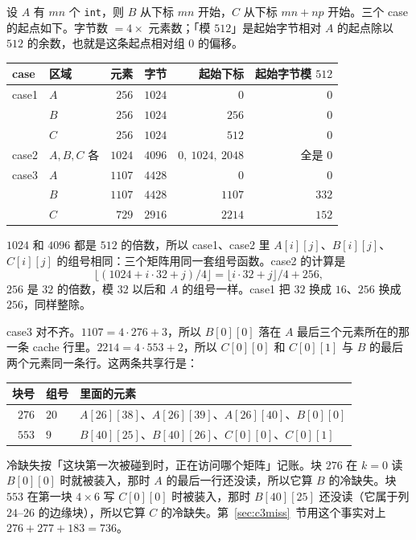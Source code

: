 \documentclass[11pt,a4paper,fontset=fandol]{ctexart}
\newcommand{\code}[1]{\texttt{#1}}
\begin{document}
设 $A$ 有 $mn$ 个 \code{int}，则 $B$ 从下标 $mn$ 开始，$C$ 从下标 $mn+np$ 开始。三个 case 的起点如下。字节数 $=4\times$ 元素数；「模 $512$」是起始字节相对 $A$ 的起点除以 $512$ 的余数，也就是这条起点相对组 $0$ 的偏移。

\begin{center}
\small
\begin{tabular}{@{}llrrrr@{}}
\toprule
case & 区域 & 元素 & 字节 & 起始下标 & 起始字节模 $512$\\
\midrule
case1 & $A$ & $256$ & $1024$ & $0$ & $0$\\
 & $B$ & $256$ & $1024$ & $256$ & $0$\\
 & $C$ & $256$ & $1024$ & $512$ & $0$\\
case2 & $A,B,C$ 各 & $1024$ & $4096$ & $0,\ 1024,\ 2048$ & 全是 $0$\\
case3 & $A$ & $1107$ & $4428$ & $0$ & $0$\\
 & $B$ & $1107$ & $4428$ & $1107$ & $332$\\
 & $C$ & $729$ & $2916$ & $2214$ & $152$\\
\bottomrule
\end{tabular}
\end{center}

$1024$ 和 $4096$ 都是 $512$ 的倍数，所以 case1、case2 里 $A[i][j]$、$B[i][j]$、$C[i][j]$ 的组号相同：三个矩阵用同一套组号函数。case2 的计算是
\[
\lfloor(1024+i\cdot 32+j)/4\rfloor=\lfloor i\cdot 32+j\rfloor/4+256,
\]
$256$ 是 $32$ 的倍数，模 $32$ 以后和 $A$ 的组号一样。case1 把 $32$ 换成 $16$、$256$ 换成 $256$，同样整除。

case3 对不齐。$1107=4\cdot276+3$，所以 $B[0][0]$ 落在 $A$ 最后三个元素所在的那一条 cache 行里。$2214=4\cdot553+2$，所以 $C[0][0]$ 和 $C[0][1]$ 与 $B$ 的最后两个元素同一条行。这两条共享行是：

\begin{center}
\small
\begin{tabular}{@{}rll@{}}
\toprule
块号 & 组号 & 里面的元素\\
\midrule
$276$ & $20$ & $A[26][38]$、$A[26][39]$、$A[26][40]$、$B[0][0]$\\
$553$ & $9$ & $B[40][25]$、$B[40][26]$、$C[0][0]$、$C[0][1]$\\
\bottomrule
\end{tabular}
\end{center}

冷缺失按「这块第一次被碰到时，正在访问哪个矩阵」记账。块 $276$ 在 $k=0$ 读 $B[0][0]$ 时就被装入，那时 $A$ 的最后一行还没读，所以它算 $B$ 的冷缺失。块 $553$ 在第一块 $4\times6$ 写 $C[0][0]$ 时被装入，那时 $B[40][25]$ 还没读（它属于列 $24$--$26$ 的边缘块），所以它算 $C$ 的冷缺失。第~\ref{sec:c3miss}~节用这个事实对上 $276+277+183=736$。
\end{document}
